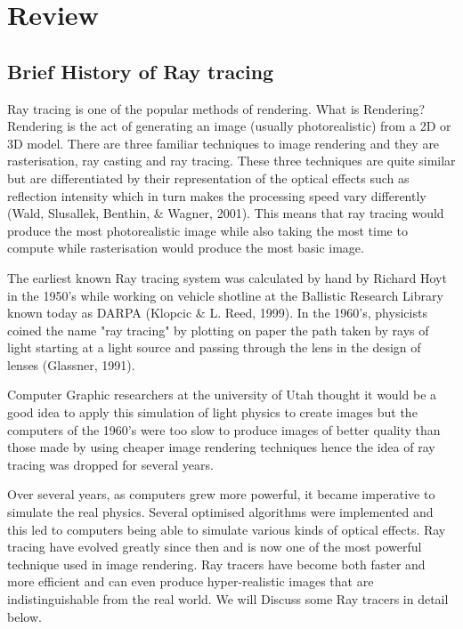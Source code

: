 \documentclass{article}
\begin{document}
	\section{Review}
	\subsection{Brief History of Ray tracing}
	
	\par Ray tracing is one of the popular methods of rendering. What is Rendering? Rendering is the act of generating an image (usually photorealistic) from a 2D or 3D model. There are three familiar techniques to image rendering and they are rasterisation, ray casting and ray tracing. These three techniques are quite similar but are differentiated by their representation of the optical effects such as reflection intensity which in turn makes the processing speed vary differently (Wald, Slusallek, Benthin, \& Wagner, 2001). This means that ray tracing would produce the most photorealistic image while also taking the most time to compute while rasterisation would produce the most basic image.\\
	
	\par The earliest known Ray tracing system was calculated by hand by Richard Hoyt in the 1950's while working on vehicle shotline at the Ballistic Research Library known today as DARPA (Klopcic \& L. Reed, 1999). In the 1960's, physicists coined the name "ray tracing" by plotting on paper the path taken by rays of light starting at a light source and passing through the lens in the design of lenses (Glassner, 1991).\\
	
	\par Computer Graphic researchers at the university of Utah thought it would be a good idea to apply this simulation of light physics to create images but the computers of the 1960's were too slow to produce images of better quality than those made by using cheaper image rendering techniques hence the idea of ray tracing was dropped for several years.\\
	
	\par Over several years, as computers grew more powerful, it became imperative to simulate the real physics. Several optimised algorithms were implemented and this led to computers being able to simulate various kinds of optical effects. Ray tracing have evolved greatly since then and is now one of the most powerful technique used in image rendering. Ray tracers have become both faster and more efficient and can even produce hyper-realistic images that are indistinguishable from the real world. We will Discuss some Ray tracers in detail below.\\
	
\end{document}
